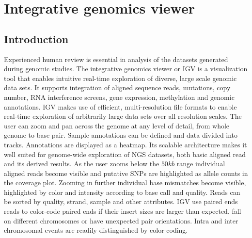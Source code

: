 \chapter{Integrative genomics viewer}

\section{Introduction}
Experienced human review is essential in analysis of the datasets generated during genomic studies.
The integrative genomics viewer or IGV is a visualization tool that enables intuitive real-time exploration of diverse, large scale genomic data sets.
It supports integration of aligned sequence reads, mutations, copy number, RNA interference screens, gene expression, methylation and genomic annotations.
IGV makes use of efficient, multi-resolution file formats to enable real-time exploration of arbitrarily large data sets over all resolution scales.
The user can zoom and pan across the genome at any level of detail, from whole genome to base pair.
Sample annotations can be defined and data divided into tracks.
Annotations are displayed as a heatmap.
Its scalable architecture makes it well suited for genome-wide exploration of NGS datasets, both basic aligned read and its derived results.
As the user zooms below the $50kb$ range individual aligned reads become visible and putative SNPs are highlighted as allele counts in the coverage plot.
Zooming in further individual base mismatches become visible, highlighted by color and intensity according to base call and quality.
Reads can be sorted by quality, strand, sample and other attributes.
IGV use paired ends reads to color-code paired ends if their insert sizes are larger than expected, fall on different chromosomes or have unexpected pair orientations.
Intra and inter chromosomal events are readily distinguished by color-coding.
